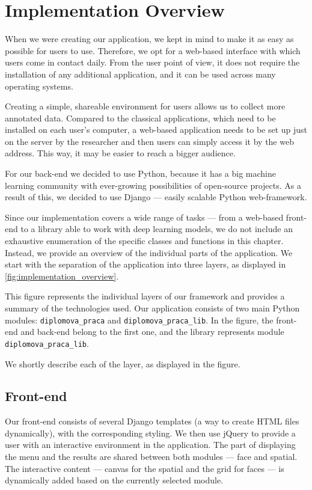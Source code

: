 \chapter{Implementation Overview}
\label{ch:developers_guide}
\label{ch:programmers_guide}

When we were creating our application, we kept in mind to make it as easy as possible for users to use. Therefore, we opt for a web-based interface with which users come in contact daily. From the user point of view, it does not require the installation of any additional application, and it can be used across many operating systems.

Creating a simple, shareable environment for users allows us to collect more annotated data. Compared to the classical applications, which need to be installed on each user's computer, a web-based application needs to be set up just on the server by the researcher and then users can simply access it by the web address. This way, it may be easier to reach a bigger audience.

For our back-end we decided to use Python, because it has a big machine learning community with ever-growing possibilities of open-source projects. As a result of this, we decided to use Django --- easily scalable Python web-framework.

Since our implementation covers a wide range of tasks --- from a web-based front-end to a library able to work with deep learning models, we do not include an exhaustive enumeration of the specific classes and functions in this chapter. Instead, we provide an overview of the individual parts of the application. We start with the separation of the application into three layers, as displayed in \autoref{fig:implementation_overview}.

This figure represents the individual layers of our framework and provides a summary of the technologies used. Our application consists of two main Python modules: \verb+diplomova_praca+ and \verb+diplomova_praca_lib+. In the figure, the front-end and back-end belong to the first one, and the library represents module \verb+diplomova_praca_lib+.

We shortly describe each of the layer, as displayed in the figure.

\section{Front-end}

Our front-end consists of several Django templates (a way to create HTML files dynamically), with the corresponding styling. We then use jQuery to provide a user with an interactive environment in the application.  The part of displaying the menu and the results are shared between both modules --- face and spatial. The interactive content --- canvas for the spatial and the grid for faces --- is dynamically added based on the currently selected module.

